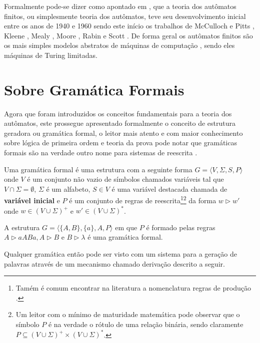 Formalmente pode-se dizer como apontado em \cite{valdi2020phd}, que a teoria dos autômatos finitos, ou simplesmente teoria dos autômatos, teve seu desenvolvimento inicial entre os anos de 1940 e 1960 sendo este início os trabalhos de McCulloch e Pitts \cite{mcculloch1943}, Kleene \cite{kleene1951}, Mealy \cite{mealy1955}, Moore \cite{moore1956}, Rabin e Scott \cite{rabin1963, rabin1959}. De forma geral os autômatos finitos são os mais simples modelos abstratos de máquinas de computação \cite{farias2017}, sendo eles máquinas de Turing limitadas. 

\section{Sobre Gramática Formais}\label{sec:GramaticaFormal}

Agora que foram introduzidos os conceitos fundamentais para a teoria dos autômatos, este prossegue apresentado formalmente o conceito de estrutura geradora ou gramática formal, o leitor mais atento e com maior conhecimento sobre lógica de primeira ordem e teoria da prova \cite{avigad1998, buss1998} pode notar que gramáticas formais são na verdade outro nome para  sistemas de reescrita \cite{ayala2014}.

\begin{definition}\label{def:GramaticaFormal}
	Uma gramática formal é uma estrutura com a seguinte forma $G = \langle V, \Sigma, S, P \rangle$ onde $V$ é um conjunto não vazio de símbolos chamados variáveis tal que $V \cap \Sigma = \emptyset$, $\Sigma$ é um alfabeto, $S \in V$ é uma variável destacada chamada de \textbf{variável inicial} e $P$ é um conjunto de regras de reescrita\footnote{Tamém é comum encontrar na literatura a nomenclatura regras de produção \cite{benjaLivro2010, linz2006}.}\footnote{Um leitor com o mínimo de maturidade matemática pode observar que o símbolo $P$ é na verdade o rótulo de uma relação binária, sendo claramente $P \subseteq (V \cup \Sigma)^+ \times (V \cup \Sigma)^*$.} da forma $w \rhd w'$ onde $w \in (V \cup \Sigma)^+$ e $w' \in (V \cup \Sigma)^*$.
\end{definition}

\begin{example}\label{exe:GramaticaFormal1} 
	A estrutura $G = \langle \{A, B\}, \{a\}, A, P \rangle$ em que $P$ é formado pelas regras $A \rhd aABa, A \rhd B$ e $B \rhd \lambda$ é uma gramática formal.
\end{example}

Qualquer gramática então pode ser visto com um sistema para a geração de palavras através de um mecanismo chamado derivação descrito a seguir.

